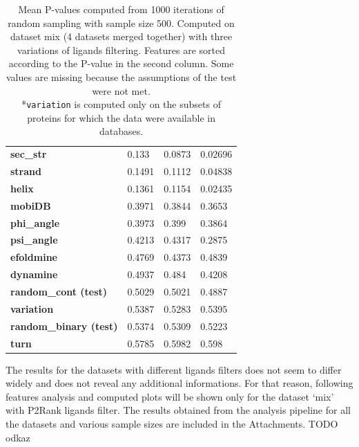\begin{table}[!htbp]
\begin{tabular}{llll}
\textbf{sec\_str}             & 0.133              & 0.0873                 & 0.02696              \\
\textbf{strand}               & 0.1491             & 0.1112                 & 0.04838              \\
\textbf{helix}                & 0.1361             & 0.1154                 & 0.02435              \\
\textbf{mobiDB}               & 0.3971             & 0.3844                 & 0.3653               \\
\textbf{phi\_angle}           & 0.3973             & 0.399                  & 0.3864               \\
\textbf{psi\_angle}           & 0.4213             & 0.4317                 & 0.2875               \\
\textbf{efoldmine}            & 0.4769             & 0.4373                 & 0.4839               \\
\textbf{dynamine}             & 0.4937             & 0.484                  & 0.4208               \\
\textbf{random\_cont (test)}         & 0.5029             & 0.5021                 & 0.4887               \\
\textbf{variation}            & 0.5387             & 0.5283                 & 0.5395               \\
\textbf{random\_binary (test)}       & 0.5374             & 0.5309                 & 0.5223               \\
\textbf{turn}                 & 0.5785             & 0.5982                 & 0.598                \\ \hline
\end{tabular}
\caption{Mean P-values computed from 1000 iterations of random sampling with sample size 500. Computed on dataset mix (4 datasets merged together) with three variations of ligands filtering. Features are sorted according to the P-value in the second column. Some values are missing because the assumptions of the test were not met.\\\hspace{\textwidth}
*\texttt{variation} is computed only on the subsets of proteins for which the data were available in databases.}
\label{tab:pvalues500}
\end{table}

The results for the datasets with different ligands filters does not seem to differ widely and does not reveal any additional informations. For that reason, following features analysis and computed plots will be shown only for the dataset `mix' with P2Rank ligands filter. The results obtained from the analysis pipeline for all the datasets and various sample sizes are included in the Attachments. TODO odkaz


